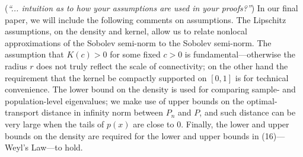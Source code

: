 \documentclass{article}
\begin{document}
(\textit{“... intuition as to how your assumptions are used in your proofs?”}) In our final paper, we will include the following comments on assumptions. The Lipschitz assumptions, on the density and kernel, allow us to relate nonlocal approximations of the Sobolev semi-norm to the Sobolev semi-norm. The assumption that $K(c) > 0$ for some fixed $c > 0$ is fundamental---otherwise the radius $r$ does not truly reflect the scale of connectivity; on the other hand the requirement that the kernel be compactly supported on $[0,1]$ is for technical convenience. The lower bound on the density is used for comparing sample- and population-level eigenvalues; we make use of upper bounds on the optimal-transport distance in infinity norm between $P_n$ and $P$,  and such distance can be very large when the tails of $p(x)$ are close to $0$. Finally, the lower and upper bounds on the density are required for the lower and upper bounds in (16)---Weyl’s Law---to hold.
\end{document}
